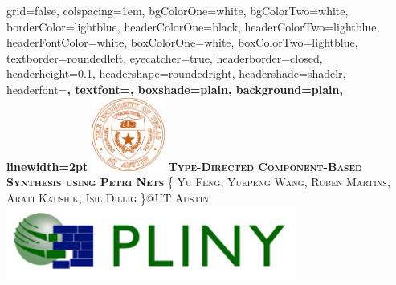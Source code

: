 \documentclass[landscape,final,a0paper,fontscale=0.285]{baposter}
\begin{document}
\begin{poster}%
  {
  grid=false,
  colspacing=1em,
  bgColorOne=white,
  bgColorTwo=white,
  borderColor=lightblue,
  headerColorOne=black,
  headerColorTwo=lightblue,
  headerFontColor=white,
  boxColorOne=white,
  boxColorTwo=lightblue,
  textborder=roundedleft,
  eyecatcher=true,
  headerborder=closed,
  headerheight=0.1\textheight,
  headershape=roundedright,
  headershade=shadelr,
  headerfont=\Large\bf\textsc, %
  textfont={\setlength{\parindent}{1.5em}},
  boxshade=plain,
  background=plain,
  linewidth=2pt
  }
  {\includegraphics[height=6.5em]{images/ut.png}} 
  {\bf\textsc{Type-Directed Component-Based Synthesis using Petri Nets}\vspace{0.1em}}
  {\textsc{\{ Yu Feng, Yuepeng Wang, Ruben Martins, Arati Kaushik, Isil Dillig \}@UT Austin}}
  {%
    \includegraphics[height=6.5em]{images/pliny.png}
  }

    \newcommand{\colouredcircle}{%
      \tikz{\useasboundingbox (-0.2em,-0.32em) rectangle(0.2em,0.32em); \draw[draw=black,fill=lightblue,line width=0.03em] (0,0) circle(0.18em);}}


\end{poster}
\end{document}
